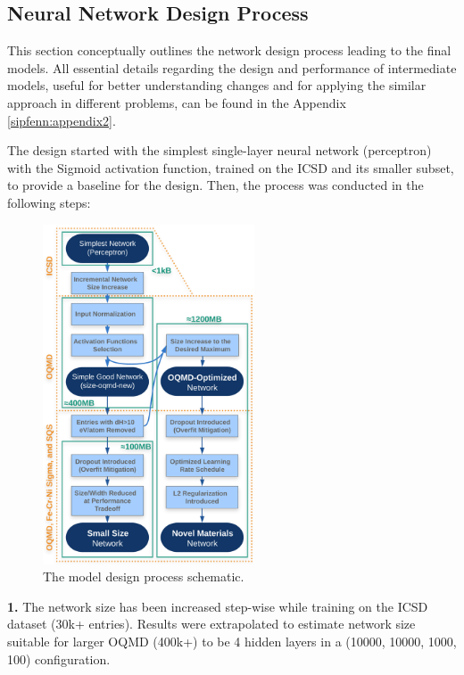 \subsection{Neural Network Design Process} \label{sipfenn:sssec:NetDesign}

This section conceptually outlines the network design process leading to the final models. All essential details regarding the design and performance of intermediate models, useful for better understanding changes and for applying the similar approach in different problems, can be found in the Appendix \ref{sipfenn:appendix2}.

The design started with the simplest single-layer neural network (perceptron) with the Sigmoid activation function, trained on the ICSD and its smaller subset, to provide a baseline for the design. Then, the process was conducted in the following steps:

    \begin{figure}[H]
    \centering
    \includegraphics[width=0.56\textwidth]{sipfenn/SIPFENN_design_updated.png}
    \caption{The model design process schematic.}
    \label{sipfenn:fig:designprocess}
    \end{figure}

\textbf{1. }The network size has been increased step-wise while training on the ICSD dataset (30k+ entries). Results were extrapolated to estimate network size suitable for larger OQMD (400k+) to be 4 hidden layers in a (10000, 10000, 1000, 100) configuration.

